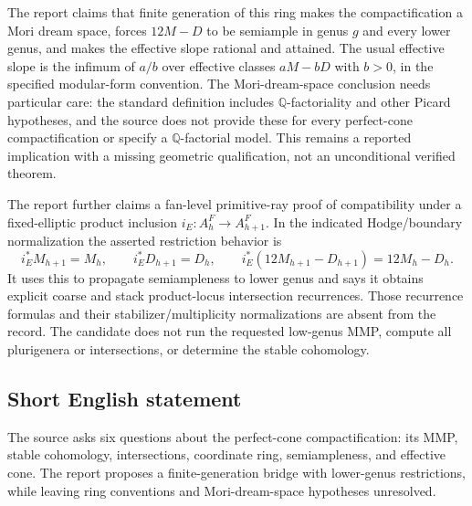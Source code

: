 \documentclass[11pt]{article}
\newcommand{\Q}{\mathbb{Q}}
\begin{document}
The report claims that finite generation of this ring makes the compactification a Mori dream space, forces \(12M-D\) to be semiample in genus \(g\) and every lower genus, and makes the effective slope rational and attained. The usual effective slope is the infimum of \(a/b\) over effective classes \(aM-bD\) with \(b>0\), in the specified modular-form convention. The Mori-dream-space conclusion needs particular care: the standard definition includes \(\Q\)-factoriality and other Picard hypotheses, and the source does not provide these for every perfect-cone compactification or specify a \(\Q\)-factorial model. This remains a reported implication with a missing geometric qualification, not an unconditional verified theorem.

The report further claims a fan-level primitive-ray proof of compatibility under a fixed-elliptic product inclusion \(i_E:A_h^F\to A_{h+1}^F\). In the indicated Hodge/boundary normalization the asserted restriction behavior is
\[
i_E^*M_{h+1}=M_h,\qquad i_E^*D_{h+1}=D_h,\qquad
i_E^*(12M_{h+1}-D_{h+1})=12M_h-D_h.
\]
It uses this to propagate semiampleness to lower genus and says it obtains explicit coarse and stack product-locus intersection recurrences. Those recurrence formulas and their stabilizer/multiplicity normalizations are absent from the record. The candidate does not run the requested low-genus MMP, compute all plurigenera or intersections, or determine the stable cohomology.
\subsection{Short English statement}
The source asks six questions about the perfect-cone compactification: its MMP, stable cohomology, intersections, coordinate ring, semiampleness, and effective cone. The report proposes a finite-generation bridge with lower-genus restrictions, while leaving ring conventions and Mori-dream-space hypotheses unresolved.
\end{document}

